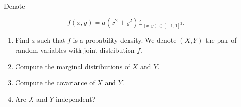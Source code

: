 \begin{Exercise}
  Denote

  \[
    f(x, y)=a\left(x^{2}+y^{2}\right) \mathbb{1}_{(x, y) \in {[-1,1]}^{2}} .
  \]

  \begin{enumerate}
    \item Find $a$ such that $f$ is a probability density. We denote $(X, Y)$ the pair of
          random variables with joint distribution $f$.

    \item Compute the marginal distributions of $X$ and $Y$.

    \item Compute the covariance of $X$ and $Y$.

    \item Are $X$ and $Y$ independent?

  \end{enumerate}
\end{Exercise}



